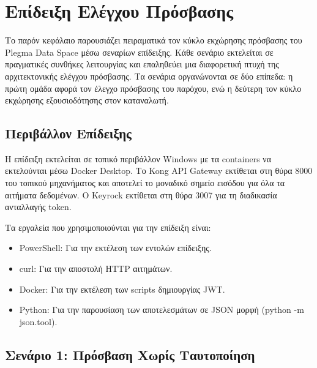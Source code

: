 \chapter{Επίδειξη Ελέγχου Πρόσβασης}
\label{ch:demonstration}

Το παρόν κεφάλαιο παρουσιάζει πειραματικά τον κύκλο εκχώρησης πρόσβασης
του \textlatin{Plegma Data Space} μέσω σεναρίων επίδειξης. Κάθε σενάριο
εκτελείται σε πραγματικές συνθήκες λειτουργίας και επαληθεύει μια διαφορετική
πτυχή της αρχιτεκτονικής ελέγχου πρόσβασης. Τα σενάρια οργανώνονται σε δύο
επίπεδα: η πρώτη ομάδα αφορά τον έλεγχο πρόσβασης του παρόχου, ενώ η δεύτερη
τον κύκλο εκχώρησης εξουσιοδότησης στον καταναλωτή.

\section{Περιβάλλον Επίδειξης}
\label{sec:demo-environment}

Η επίδειξη εκτελείται σε τοπικό περιβάλλον \textlatin{Windows} με τα
\textlatin{containers} να εκτελούνται μέσω \textlatin{Docker Desktop}. Το
\textlatin{Kong API Gateway} εκτίθεται στη θύρα \textlatin{8000} του τοπικού
μηχανήματος και αποτελεί το μοναδικό σημείο εισόδου για όλα τα αιτήματα
δεδομένων. Ο \textlatin{Keyrock} εκτίθεται στη θύρα \textlatin{3007} για τη
διαδικασία ανταλλαγής \textlatin{token}.

Τα εργαλεία που χρησιμοποιούνται για την επίδειξη είναι:
\begin{itemize}
    \item \textlatin{PowerShell}: Για την εκτέλεση των εντολών
    επίδειξης.
    \item \textlatin{curl}: Για την αποστολή \textlatin{HTTP}
    αιτημάτων.
    \item \textlatin{Docker}: Για την εκτέλεση των \textlatin{scripts}
    δημιουργίας \textlatin{JWT}.
    \item \textlatin{Python}: Για την παρουσίαση των αποτελεσμάτων
    σε \textlatin{JSON} μορφή (\textlatin{python -m json.tool}).
\end{itemize}

\section{Σενάριο 1: Πρόσβαση Χωρίς Ταυτοποίηση}
\label{sec:scenario1}

